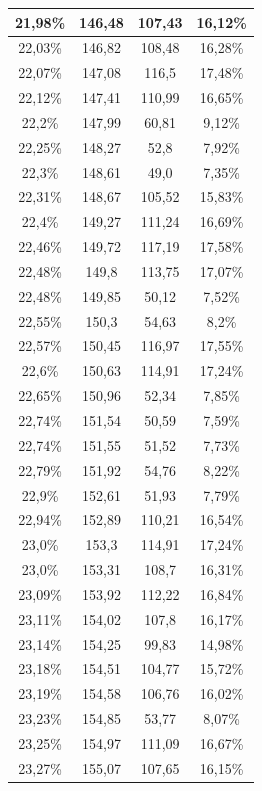 \begin{center}
\begin{longtable}{|c|c|c|c|}
21,98\% & 146,48 & 107,43 & 16,12\%  \\ \hline
22,03\% & 146,82 & 108,48 & 16,28\%  \\ \hline
22,07\% & 147,08 & 116,5 & 17,48\%  \\ \hline
22,12\% & 147,41 & 110,99 & 16,65\%  \\ \hline
22,2\% & 147,99 & 60,81 & 9,12\%  \\ \hline
22,25\% & 148,27 & 52,8 & 7,92\%  \\ \hline
22,3\% & 148,61 & 49,0 & 7,35\%  \\ \hline
22,31\% & 148,67 & 105,52 & 15,83\%  \\ \hline
22,4\% & 149,27 & 111,24 & 16,69\%  \\ \hline
22,46\% & 149,72 & 117,19 & 17,58\%  \\ \hline
22,48\% & 149,8 & 113,75 & 17,07\%  \\ \hline
22,48\% & 149,85 & 50,12 & 7,52\%  \\ \hline
22,55\% & 150,3 & 54,63 & 8,2\%  \\ \hline
22,57\% & 150,45 & 116,97 & 17,55\%  \\ \hline
22,6\% & 150,63 & 114,91 & 17,24\%  \\ \hline
22,65\% & 150,96 & 52,34 & 7,85\%  \\ \hline
22,74\% & 151,54 & 50,59 & 7,59\%  \\ \hline
22,74\% & 151,55 & 51,52 & 7,73\%  \\ \hline
22,79\% & 151,92 & 54,76 & 8,22\%  \\ \hline
22,9\% & 152,61 & 51,93 & 7,79\%  \\ \hline
22,94\% & 152,89 & 110,21 & 16,54\%  \\ \hline
23,0\% & 153,3 & 114,91 & 17,24\%  \\ \hline
23,0\% & 153,31 & 108,7 & 16,31\%  \\ \hline
23,09\% & 153,92 & 112,22 & 16,84\%  \\ \hline
23,11\% & 154,02 & 107,8 & 16,17\%  \\ \hline
23,14\% & 154,25 & 99,83 & 14,98\%  \\ \hline
23,18\% & 154,51 & 104,77 & 15,72\%  \\ \hline
23,19\% & 154,58 & 106,76 & 16,02\%  \\ \hline
23,23\% & 154,85 & 53,77 & 8,07\%  \\ \hline
23,25\% & 154,97 & 111,09 & 16,67\%  \\ \hline
23,27\% & 155,07 & 107,65 & 16,15\%  \\ \hline

\end{longtable}
\end{center}
